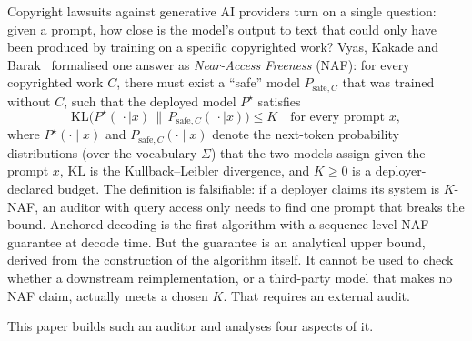 \documentclass{article}
\begin{document}
Copyright lawsuits against generative AI providers \cite{nyt2023openai,authors2023suit} turn on a single question: given a prompt, how close is the model's output to text that could only have been produced by training on a specific copyrighted work?  Vyas, Kakade and Barak~\cite{vyas2023naf} formalised one answer as \emph{Near-Access Freeness} (NAF): for every copyrighted work $C$, there must exist a ``safe'' model $P_{\mathrm{safe},C}$ that was trained without $C$, such that the deployed model $P^\star$ satisfies
\[
  \mathrm{KL}\bigl(P^\star(\,\cdot\mid x)\,\|\,P_{\mathrm{safe},C}(\,\cdot\mid x)\bigr)\le K\quad \text{for every prompt }x,
\]
where $P^\star(\cdot\mid x)$ and $P_{\mathrm{safe},C}(\cdot\mid x)$ denote the next-token probability distributions (over the vocabulary $\Sigma$) that the two models assign given the prompt $x$, $\mathrm{KL}$ is the Kullback--Leibler divergence, and $K\ge 0$ is a deployer-declared budget.
The definition is falsifiable: if a deployer claims its system is $K$-NAF, an auditor with query access only needs to find one prompt that breaks the bound.  Anchored decoding \cite{he2026anchored} is the first algorithm with a sequence-level NAF guarantee at decode time.  But the guarantee is an analytical upper bound, derived from the construction of the algorithm itself.  It cannot be used to check whether a downstream reimplementation, or a third-party model that makes no NAF claim, actually meets a chosen $K$.  That requires an external audit.

This paper builds such an auditor and analyses four aspects of it.
\end{document}

